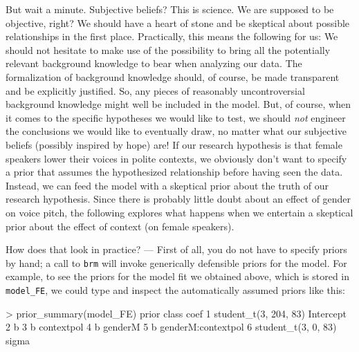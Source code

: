 \documentclass[nobib]{tufte-handout}
\begin{document}
But wait a minute. Subjective beliefs? This is science. We are supposed to be objective, right?
We should have a heart of stone and be skeptical about possible relationships in the first
place. Practically, this means the following for us: We should not hesitate to make use of the
possibility to bring all the potentially relevant background knowledge to bear when analyzing
our data. The formalization of background knowledge should, of course, be made transparent and
be explicitly justified. So, any pieces of reasonably uncontroversial background knowledge
might well be included in the model. But, of course, when it comes to the specific hypotheses
we would like to test, we should \emph{not} engineer the conclusions we would like to
eventually draw, no matter what our subjective beliefs (possibly inspired by hope) are! If our
research hypothesis is that female speakers lower their voices in polite contexts, we obviously
don't want to specify a prior that assumes the hypothesized relationship before having seen the
data. Instead, we can feed the model with a skeptical prior about the truth of our
research hypothesis. Since there is probably little doubt about an effect of gender on voice
pitch, the following explores what happens when we entertain a skeptical prior about the effect
of context (on female speakers).


How does that look in practice? --- First of all, you do not have to specify priors by hand; a call to \texttt{brm} will invoke generically defensible priors for the model. For example, to see the priors for the model fit we obtained above, which is stored in \texttt{model\_FE}, we could type and inspect the automatically assumed priors like this:

\medskip

\begin{minipage}[]{\textwidth}
\begin{rc}
> prior_summary(model_FE)
                  prior     class               coef 
1 student_t(3, 204, 83) Intercept                    
2                               b                    
3                               b         contextpol 
4                               b            genderM 
5                               b genderM:contextpol 
6   student_t(3, 0, 83)     sigma  
\end{rc}
\end{minipage}
\end{document}

